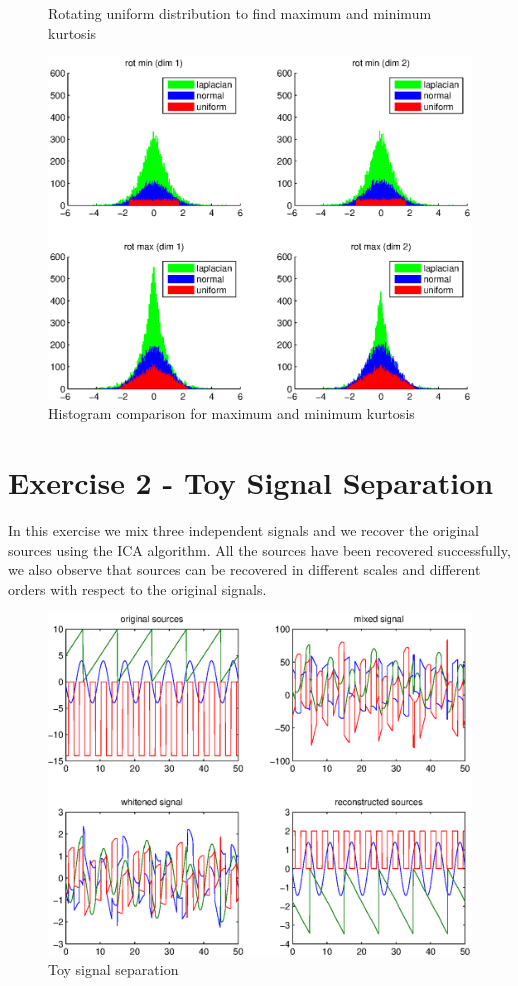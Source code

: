 \documentclass[a4paper,english]{article}
\begin{document}
\begin{figure}
\caption{Rotating uniform distribution to find maximum and minimum kurtosis}
\end{figure}

\begin{figure}
\includegraphics[scale = .8]{kurthist.eps}
\centering
\caption{Histogram comparison for maximum and minimum kurtosis}
\end{figure}

\clearpage

\section*{Exercise 2 - Toy Signal Separation}

In this exercise we mix three independent signals and we recover the original sources using the ICA algorithm.
All the sources have been recovered successfully, we also observe that sources can be recovered in different scales and different orders with respect to the original signals.

\begin{figure}[h!]
\includegraphics[scale = .8]{toysep.eps}
\centering
\caption{Toy signal separation}
\end{figure}
\end{document}
